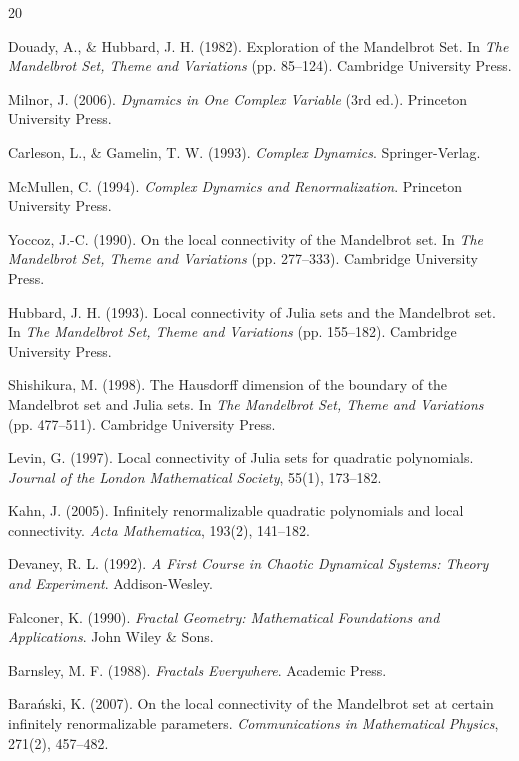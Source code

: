 \documentclass[12pt]{article}
\begin{document}
\begin{thebibliography}{20}

Douady, A., \& Hubbard, J. H. (1982). Exploration of the Mandelbrot Set. In \textit{The Mandelbrot Set, Theme and Variations} (pp. 85--124). Cambridge University Press.

Milnor, J. (2006). \textit{Dynamics in One Complex Variable} (3rd ed.). Princeton University Press.

Carleson, L., \& Gamelin, T. W. (1993). \textit{Complex Dynamics}. Springer-Verlag.

McMullen, C. (1994). \textit{Complex Dynamics and Renormalization}. Princeton University Press.

Yoccoz, J.-C. (1990). On the local connectivity of the Mandelbrot set. In \textit{The Mandelbrot Set, Theme and Variations} (pp. 277--333). Cambridge University Press.

Hubbard, J. H. (1993). Local connectivity of Julia sets and the Mandelbrot set. In \textit{The Mandelbrot Set, Theme and Variations} (pp. 155--182). Cambridge University Press.

Shishikura, M. (1998). The Hausdorff dimension of the boundary of the Mandelbrot set and Julia sets. In \textit{The Mandelbrot Set, Theme and Variations} (pp. 477--511). Cambridge University Press.

Levin, G. (1997). Local connectivity of Julia sets for quadratic polynomials. \textit{Journal of the London Mathematical Society}, 55(1), 173--182.

Kahn, J. (2005). Infinitely renormalizable quadratic polynomials and local connectivity. \textit{Acta Mathematica}, 193(2), 141--182.

Devaney, R. L. (1992). \textit{A First Course in Chaotic Dynamical Systems: Theory and Experiment}. Addison-Wesley.

Falconer, K. (1990). \textit{Fractal Geometry: Mathematical Foundations and Applications}. John Wiley \& Sons.

Barnsley, M. F. (1988). \textit{Fractals Everywhere}. Academic Press.

Barański, K. (2007). On the local connectivity of the Mandelbrot set at certain infinitely renormalizable parameters. \textit{Communications in Mathematical Physics}, 271(2), 457--482.


\end{thebibliography}
\end{document}
